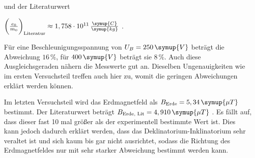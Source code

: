 und der Literaturwert

\begin{center}
    $\bigg( \frac{e_0}{m_0} \bigg)_\text{Literatur} \approx 1,758 \cdot 10^{11} \, \frac{\symup{C}}{\symup{kg}}$ \cite{elektron}.
\end{center}

Für eine Beschleunigungsspannung von $U_B = 250 \, \symup{V}$ beträgt die Abweichung $16 \, \%$, für $400 \, \symup{V}$ beträgt sie $8 \, \%$.
Auch diese Ausgleichsgeraden nähern die Messwerte gut an.
Dieselben Ungenauigkeiten wie im ersten Versuchsteil treffen auch hier zu, womit die geringen Abweichungen erklärt werden können.

Im letzten Versuchsteil wird das Erdmagnetfeld als $B_\text{Erde} = 5,34 \, \symup{\mu T}$ bestimmt.
Der Literaturwert beträgt $B_\text{Erde, Lit} = 4,910 \, \symup{\mu T}$ \cite{erdmagnet}.
Es fällt auf, dass dieser fast 10 mal größer als der experimentell bestimmte Wert ist.
Dies kann jedoch dadurch erklärt werden, dass das Deklinatorium-Inklinatorium sehr veraltet ist und sich kaum bis gar nicht ausrichtet,
sodass die Richtung des Erdmagnetfeldes nur mit sehr starker Abweichung bestimmt werden kann.